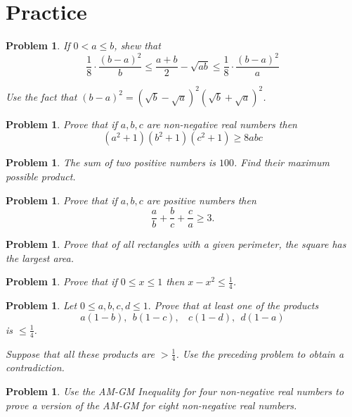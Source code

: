 \documentclass[11pt, openany]{book}
\theoremstyle{change} \theoremheaderfont{\blue\sffamily\bfseries}
\newtheorem{pro}[thm]{Problem}
\theoremstyle{nonumberplain} \theoremheaderfont{\sffamily\bfseries}
\newcommand{\í}{\'{\i}}
\begin{document}
\section*{Practice}\begin{multicols}{2}\columnseprule 1pt \columnsep 25pt

\begin{pro}
If $0 < a \leq b$, shew that
$$\frac{1}{8}\cdot\frac{(b - a)^2}{b} \leq \frac{a + b}{2} - \sqrt{ab} \leq \frac{1}{8}\cdot\frac{(b - a)^2}{a} $$
\begin{answer}
Use the fact that $(b - a)^2 = (\sqrt{b} - \sqrt{a})^2(\sqrt{b} +
\sqrt{a})^2$.
\end{answer}
\end{pro}
\begin{pro}
Prove that if $a, b, c$ are non-negative real numbers then $$(a^2
+ 1)(b^2 + 1)(c^2 + 1) \geq 8abc$$
\end{pro}
\begin{pro}
The sum of two positive numbers is $100$. Find their maximum
possible product.
\end{pro}
\begin{pro}
Prove that if $a, b, c$ are positive numbers then
$$\frac{a}{b} + \frac{b}{c} + \frac{c}{a} \geq 3.$$

\end{pro}

\begin{pro}
Prove that of all rectangles with a given perimeter, the square
has the largest area.
\end{pro}
\begin{pro}
Prove that if $0 \leq x \leq 1$ then $x - x^2 \leq \frac{1}{4}$.
\end{pro}
\begin{pro}
Let $0 \leq a, b, c, d \leq 1.$ Prove that at least one of the
products $$a(1 - b), \ \ b(1 - c),\ \  \ \ c(1 - d),\ \  d(1 -
a)$$ is $ \leq \frac{1}{4}$.
\begin{answer}
Suppose that all these products are $ > \frac{1}{4}$. Use the
preceding problem to obtain a contradiction.
\end{answer}
\end{pro}
\begin{pro}
Use the AM-GM Inequality for four non-negative real numbers to
prove a version of the AM-GM for eight non-negative real numbers.
\end{pro}\end{multicols}
\end{document}
